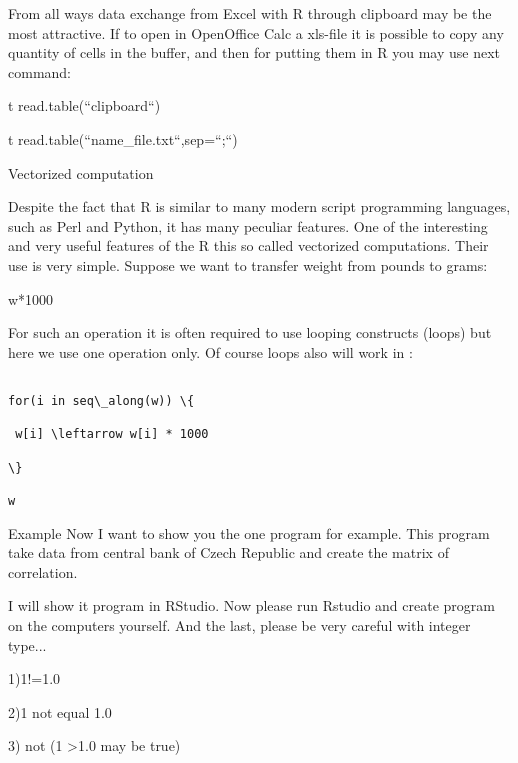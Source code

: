 \documentclass{beamer}
\begin{document}
\begin{frame}{}

From all ways data exchange from Excel with R through clipboard may be the most attractive. If to open in OpenOffice Calc a xls-file it is possible to copy any quantity of cells in the buffer, and then for  putting  them in R you may  use next command:

\begin{center}

t \leftarrow read.table(``clipboard``)

t \leftarrow read.table(``name\_file.txt``,sep=``;``)

\end{center}

\end{frame}

\begin{frame}{Vectorized computation}

Despite the fact that R is similar to many modern script programming languages, such as Perl and Python, it has many peculiar features. One of the interesting and very useful features of the R this so called vectorized computations. Their use is very simple. Suppose we want to transfer weight from pounds to grams:
\begin{center}

w*1000

\end{center}
\end{frame}


\begin{frame}{}
For such an operation it is often required to use looping constructs (loops) but here we use one operation only. Of course loops also will work in \R:
\begin{center}
\begin{verbatim}

for(i in seq\_along(w)) \{

 w[i] \leftarrow w[i] * 1000

\}

w
\end{verbatim}
\end{center}
\end{frame}


\begin{frame}{Example}
Now I want to show you  the  one program for example.
This program take data from  central bank of Czech Republic  and create the matrix of correlation.

I will show it program in RStudio.
Now please  run Rstudio and  create program on  the   computers yourself.
And the last, please be very careful with  integer type...

1)1!=1.0  
 
2)1 not equal 1.0

3) not (1 >1.0  may  be true)

\begin{center}

\end{center}
\end{frame}
\end{document}
